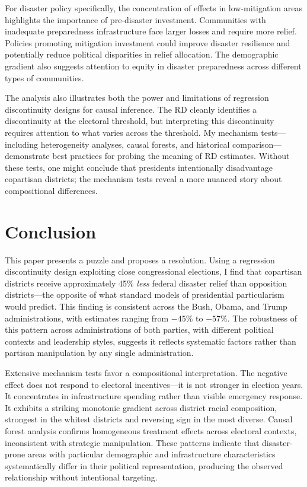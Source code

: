 \documentclass[12pt,letterpaper,oneside]{book}
\begin{document}
For disaster policy specifically, the concentration of effects in low-mitigation areas highlights the importance of pre-disaster investment. Communities with inadequate preparedness infrastructure face larger losses and require more relief. Policies promoting mitigation investment could improve disaster resilience and potentially reduce political disparities in relief allocation. The demographic gradient also suggests attention to equity in disaster preparedness across different types of communities.

The analysis also illustrates both the power and limitations of regression discontinuity designs for causal inference. The RD cleanly identifies a discontinuity at the electoral threshold, but interpreting this discontinuity requires attention to what varies across the threshold. My mechanism tests---including heterogeneity analyses, causal forests, and historical comparison---demonstrate best practices for probing the meaning of RD estimates. Without these tests, one might conclude that presidents intentionally disadvantage copartisan districts; the mechanism tests reveal a more nuanced story about compositional differences.

\section{Conclusion}

This paper presents a puzzle and proposes a resolution. Using a regression discontinuity design exploiting close congressional elections, I find that copartisan districts receive approximately 45\% \emph{less} federal disaster relief than opposition districts---the opposite of what standard models of presidential particularism would predict. This finding is consistent across the Bush, Obama, and Trump administrations, with estimates ranging from $-45\%$ to $-57\%$. The robustness of this pattern across administrations of both parties, with different political contexts and leadership styles, suggests it reflects systematic factors rather than partisan manipulation by any single administration.

Extensive mechanism tests favor a compositional interpretation. The negative effect does not respond to electoral incentives---it is not stronger in election years. It concentrates in infrastructure spending rather than visible emergency response. It exhibits a striking monotonic gradient across district racial composition, strongest in the whitest districts and reversing sign in the most diverse. Causal forest analysis confirms homogeneous treatment effects across electoral contexts, inconsistent with strategic manipulation. These patterns indicate that disaster-prone areas with particular demographic and infrastructure characteristics systematically differ in their political representation, producing the observed relationship without intentional targeting.
\end{document}
